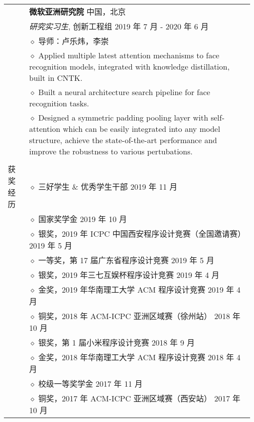 \documentclass[letterpaper, 11pt]{article}
\begin{document}
\begin{longtable}{p{1.3in}p{4.8in}}
& {\textbf{微软亚洲研究院}} \hfill 中国，北京 \\
& \textit{研究实习生}, 创新工程组 \hfill 2019 年 7 月 - 2020 年 6 月 \\
& $\diamond$ 导师：卢乐炜，李崇 \\
& $\diamond$ Applied multiple latest attention mechanisms to face recognition models, integrated with knowledge distillation, built in CNTK. \\
& $\diamond$ Built a neural architecture search pipeline for face recognition tasks. \\
& $\diamond$ Designed a symmetric padding pooling layer with self-attention which can be easily integrated into any model structure, achieve the state-of-the-art performance and improve the robustness to various pertubations. \\
& \\

{获奖经历}
& $\diamond$ 三好学生 \& 优秀学生干部 \hfill 2019 年 11 月 \\

& $\diamond$ 国家奖学金 \hfill 2019 年 10 月 \\

& $\diamond$ 银奖，2019 年 ICPC 中国西安程序设计竞赛（全国邀请赛） \hfill 2019 年 5 月 \\

& $\diamond$ 一等奖，第 17 届广东省程序设计竞赛 \hfill 2019 年 5 月 \\

& $\diamond$ 银奖，2019 年三七互娱杯程序设计竞赛 \hfill 2019 年 4 月 \\

& $\diamond$ 金奖，2019 年华南理工大学 ACM 程序设计竞赛 \hfill 2019 年 4 月 \\

& $\diamond$ 铜奖，2018 年 ACM-ICPC 亚洲区域赛（徐州站） \hfill 2018 年 10 月 \\

& $\diamond$ 银奖，第 1 届小米程序设计竞赛 \hfill 2018 年 9 月 \\

& $\diamond$ 金奖，2018 年华南理工大学 ACM 程序设计竞赛 \hfill 2018 年 4 月 \\

& $\diamond$ 校级一等奖学金 \hfill 2017 年 11 月 \\

& $\diamond$ 铜奖，2017 年 ACM-ICPC 亚洲区域赛（西安站） \hfill 2017 年 10 月 \\


\end{longtable}
\end{document}
